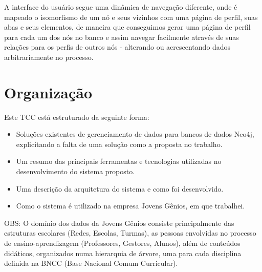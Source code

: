 A interface do usuário segue uma dinâmica de navegação diferente, onde é mapeado o isomorfismo de um nó e seus vizinhos com uma página de perfil, suas abas e seus elementos, de maneira que conseguimos gerar uma página de perfil para cada um dos nós no banco e assim navegar facilmente através de suas relações para os perfis de outros nós - alterando ou acrescentando dados arbitrariamente no processo.

\section{Organização}

Este TCC está estruturado da seguinte forma:
\begin{itemize}
  \item Soluções existentes de gerenciamento de dados para bancos de dados Neo4j, explicitando a falta de uma solução como a proposta no trabalho.
  \item Um resumo das principais ferramentas e tecnologias utilizadas no desenvolvimento do sistema proposto.
  \item Uma descrição da arquitetura do sistema e como foi desenvolvido.
  \item Como o sistema é utilizado na empresa Jovens Gênios, em que trabalhei.
\end{itemize}

OBS: O domínio dos dados da Jovens Gênios consiste principalmente das estruturas escolares (Redes, Escolas, Turmas), as pessoas envolvidas no processo de ensino-aprendizagem (Professores, Gestores, Alunos), além de conteúdos didáticos, organizados numa hierarquia de árvore, uma para cada disciplina definida na BNCC (Base Nacional Comum Curricular).
